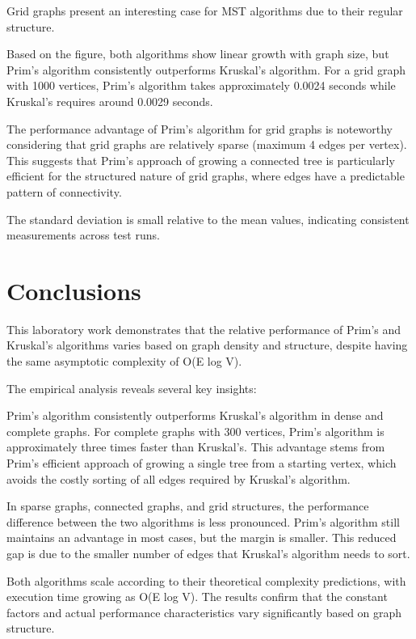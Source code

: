 \documentclass[a4paper,12pt]{article}
\begin{document}
Grid graphs present an interesting case for MST algorithms due to their regular structure.

Based on the figure, both algorithms show linear growth with graph size, but Prim's algorithm consistently outperforms Kruskal's algorithm. For a grid graph with 1000 vertices, Prim's algorithm takes approximately 0.0024 seconds while Kruskal's requires around 0.0029 seconds.

The performance advantage of Prim's algorithm for grid graphs is noteworthy considering that grid graphs are relatively sparse (maximum 4 edges per vertex). This suggests that Prim's approach of growing a connected tree is particularly efficient for the structured nature of grid graphs, where edges have a predictable pattern of connectivity.

The standard deviation is small relative to the mean values, indicating consistent measurements across test runs.
\section{Conclusions}
\label{sec:org163100e}

This laboratory work demonstrates that the relative performance of Prim's and Kruskal's algorithms varies based on graph density and structure, despite having the same asymptotic complexity of O(E log V).

The empirical analysis reveals several key insights:

Prim's algorithm consistently outperforms Kruskal's algorithm in dense and complete graphs. For complete graphs with 300 vertices, Prim's algorithm is approximately three times faster than Kruskal's. This advantage stems from Prim's efficient approach of growing a single tree from a starting vertex, which avoids the costly sorting of all edges required by Kruskal's algorithm.

In sparse graphs, connected graphs, and grid structures, the performance difference between the two algorithms is less pronounced. Prim's algorithm still maintains an advantage in most cases, but the margin is smaller. This reduced gap is due to the smaller number of edges that Kruskal's algorithm needs to sort.

Both algorithms scale according to their theoretical complexity predictions, with execution time growing as O(E log V). The results confirm that the constant factors and actual performance characteristics vary significantly based on graph structure.
\end{document}

